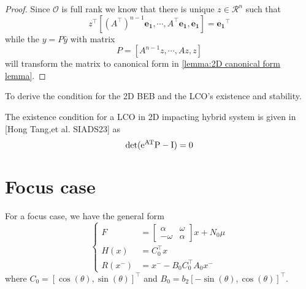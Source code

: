 \documentclass{article}
\newtheorem{proof}{Proof}[theorem]
\begin{document}
\begin{proof}
	Since $\mathcal{O}$ is full rank we know that  there is unique $z \in \mathcal{R}^n$ such that 
	$$
	z^{\top} [(A^{\top})^{n-1}\mathbf{e_1}, \cdots, A^{\top}\mathbf{e_1}, \mathbf{e_1}] = \mathbf{e_1}^{\top}
	$$ 
	while the $y = P\hat{y}$ with matrix 
	\[
	P = [A^{n-1} z , \cdots, Az, z]
	\]
	will transform the matrix to canonical form in \cref{lemma:2D canonical form lemma}.
\end{proof}
To derive the condition for the 2D BEB and the LCO's existence and stability. 

The existence condition for a LCO in 2D impacting hybrid system is given in [Hong Tang,et al. SIADS23] as
\begin{equation}
	 \operatorname{det}(\rm e^{A T} P - I ) =0
	 \label{eq:det_condition}
\end{equation}

\section{Focus case}
For a focus case, we have the general form 
\begin{equation}
	\begin{cases}
		F &= \begin{bmatrix}
			\alpha & \omega
			 \\
			-\omega & \alpha
		    \end{bmatrix} x + N_0 \mu
	  \\
	  H(x) &= C_0^{\top}x  
	  \\
	  R(x^-) &= x^- - B_0 C_0^{\top}A_0x^-
	\end{cases}
\end{equation}
where 
$C_0 = [\cos(\theta), \sin(\theta)]^{\top}$ 
and 
$B_0 = b_2 [-\sin(\theta), \cos(\theta)]^{\top}$.
\end{document}
